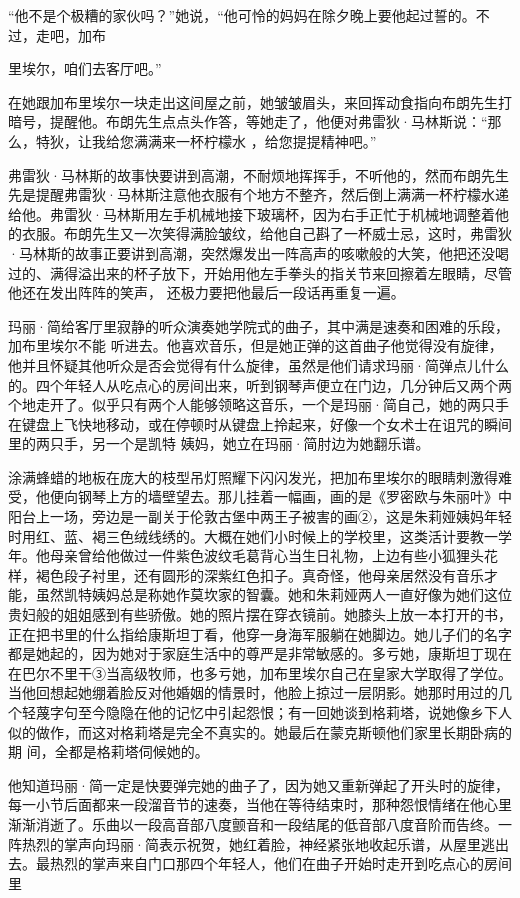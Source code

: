 \documentclass{article}
\begin{document}
“他不是个极糟的家伙吗？”她说，“他可怜的妈妈在除夕晚上要他起过誓的。不过，走吧，加布

\newpage
里埃尔，咱们去客厅吧。” 

在她跟加布里埃尔一块走出这间屋之前，她皱皱眉头，来回挥动食指向布朗先生打暗号，提醒他。布朗先生点点头作答，等她走了，他便对弗雷狄·马林斯说：“那么，特狄，让我给您满满来一杯柠檬水
，给您提提精神吧。” 

弗雷狄·马林斯的故事快要讲到高潮，不耐烦地挥挥手，不听他的，然而布朗先生先是提醒弗雷狄·马林斯注意他衣服有个地方不整齐，然后倒上满满一杯柠檬水递给他。弗雷狄·马林斯用左手机械地接下玻璃杯，因为右手正忙于机械地调整着他的衣服。布朗先生又一次笑得满脸皱纹，给他自己斟了一杯威士忌，这时，弗雷狄·马林斯的故事正要讲到高潮，突然爆发出一阵高声的咳嗽般的大笑，他把还没喝过的、满得溢出来的杯子放下，开始用他左手拳头的指关节来回擦着左眼睛，尽管他还在发出阵阵的笑声，
还极力要把他最后一段话再重复一遍。 

玛丽·简给客厅里寂静的听众演奏她学院式的曲子，其中满是速奏和困难的乐段，加布里埃尔不能
\newpage
听进去。他喜欢音乐，但是她正弹的这首曲子他觉得没有旋律，他并且怀疑其他听众是否会觉得有什么旋律，虽然是他们请求玛丽·简弹点儿什么的。四个年轻人从吃点心的房间出来，听到钢琴声便立在门边，几分钟后又两个两个地走开了。似乎只有两个人能够领略这音乐，一个是玛丽·简自己，她的两只手在键盘上飞快地移动，或在停顿时从键盘上拎起来，好像一个女术士在诅咒的瞬间里的两只手，另一个是凯特
姨妈，她立在玛丽·简肘边为她翻乐谱。 

涂满蜂蜡的地板在庞大的枝型吊灯照耀下闪闪发光，把加布里埃尔的眼睛刺激得难受，他便向钢琴上方的墙壁望去。那儿挂着一幅画，画的是《罗密欧与朱丽叶》中阳台上一场，旁边是一副关于伦敦古堡中两王子被害的画②，这是朱莉娅姨妈年轻时用红、蓝、褐三色绒线绣的。大概在她们小时候上的学校里，这类活计要教一学年。他母亲曾给他做过一件紫色波纹毛葛背心当生日礼物，上边有些小狐狸头花样，褐色段子衬里，还有圆形的深紫红色扣子。真奇怪，他母亲居然没有音乐才能，虽然凯特姨妈总是称她作莫坎家的智囊。她和朱莉娅两人一直好像为她们这位
\newpage
贵妇般的姐姐感到有些骄傲。她的照片摆在穿衣镜前。她膝头上放一本打开的书，正在把书里的什么指给康斯坦丁看，他穿一身海军服躺在她脚边。她儿子们的名字都是她起的，因为她对于家庭生活中的尊严是非常敏感的。多亏她，康斯坦丁现在在巴尔不里干③当高级牧师，也多亏她，加布里埃尔自己在皇家大学取得了学位。当他回想起她绷着脸反对他婚姻的情景时，他脸上掠过一层阴影。她那时用过的几个轻蔑字句至今隐隐在他的记忆中引起怨恨；有一回她谈到格莉塔，说她像乡下人似的做作，而这对格莉塔是完全不真实的。她最后在蒙克斯顿他们家里长期卧病的期
间，全都是格莉塔伺候她的。 

他知道玛丽·简一定是快要弹完她的曲子了，因为她又重新弹起了开头时的旋律，每一小节后面都来一段溜音节的速奏，当他在等待结束时，那种怨恨情绪在他心里渐渐消逝了。乐曲以一段高音部八度颤音和一段结尾的低音部八度音阶而告终。一阵热烈的掌声向玛丽·简表示祝贺，她红着脸，神经紧张地收起乐谱，从屋里逃出去。最热烈的掌声来自门口那四个年轻人，他们在曲子开始时走开到吃点心的房间里
\newpage
\end{document}
